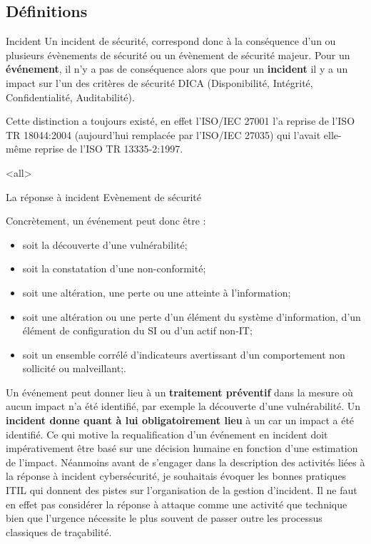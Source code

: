 \subsection{Définitions}

\begin{notebox}{Incident}
Un incident de sécurité, correspond donc à la conséquence d’un ou plusieurs évènements de sécurité ou un évènement de sécurité majeur. Pour un \textbf{événement}, il n'y a pas de conséquence alors que pour un \textbf{incident} il y a un impact sur l’un des critères de sécurité DICA (Disponibilité, Intégrité, Confidentialité, Auditabilité).
\end{notebox}

Cette distinction a toujours existé, en effet l'ISO/IEC 27001 l'a reprise de l'ISO TR 18044:2004 (aujourd'hui remplacée par l'ISO/IEC 27035) qui l'avait elle-même reprise de l'ISO TR 13335-2:1997. 


\mode<all>{\texframe
{La réponse à incident}
{Evènement de sécurité}
{%
Concrètement, un événement peut donc être :

\begin{itemize}
  \item soit la découverte d’une vulnérabilité;
  \item  soit la constatation d’une non-conformité;
  \item soit une altération, une perte ou une atteinte à l’information;
  \item   soit une altération ou une perte d’un élément du système d’information, d’un élément de configuration du SI ou d’un actif non-IT;
  \item  soit un ensemble corrélé d'indicateurs avertissant d'un comportement non sollicité ou malveillant;.
\end{itemize}
}} %

Un événement peut donner lieu à un \textbf{traitement préventif} dans la mesure où aucun impact n'a été identifié, par exemple la découverte d’une vulnérabilité.
Un \textbf{incident donne quant à lui obligatoirement lieu} à un  car un impact a été identifié.
Ce qui motive la requalification d’un événement en incident doit impérativement être basé sur une décision humaine en fonction d'une estimation de l'impact.
Néanmoins avant de s'engager dans la description des activités liées à la réponse à incident cybersécurité, je souhaitais évoquer les bonnes pratiques ITIL qui donnent des pistes sur l'organisation de la gestion d'incident. Il ne faut en effet pas considérer la réponse à attaque comme une activité que technique bien que l'urgence nécessite le plus souvent de passer outre les processus classiques de traçabilité.


